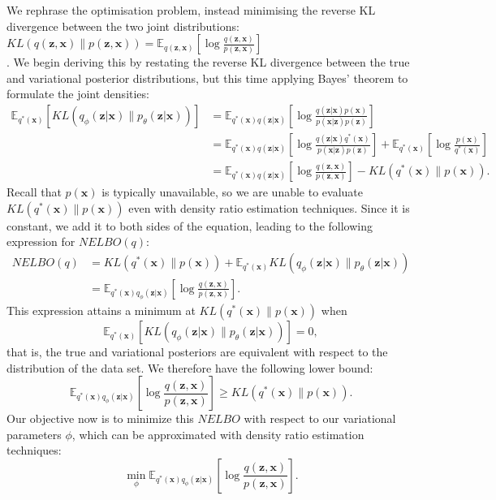 \documentclass[honours,12pt]{unswthesis}
\newcommand{\E}{\mathbb{E}}
\numberwithin{equation}{section}
\theoremstyle{definition}
\begin{document}
We rephrase the optimisation problem, instead minimising the reverse KL divergence between the two joint distributions: $KL(q(\bm{z},\bm{x})\|p(\bm{z},\bm{x}))=\E_{q(\bm{z},\bm{x})}\left[\log\frac{q(\bm{z},\bm{x})}{p(\bm{z},\bm{x})}\right]$\\\citep{tran}. We begin deriving this by restating the reverse KL divergence between the true and variational posterior distributions, but this time applying Bayes' theorem to formulate the joint densities:
\begin{align*}
\mathbb{E}_{q^*(\bm{x})}\left[KL(q_\phi(\bm{z}|\bm{x})\|p_\theta (\bm{z}|\bm{x}))\right]&=\mathbb{E}_{q^*(\bm{x})q(\bm{z}|\bm{x})}\left[\log \frac{q(\bm{z}|\bm{x})p(\bm{x})}{p(\bm{x}|\bm{z})p(\bm{z})}\right]\\
&=\mathbb{E}_{q^*(\bm{x})q(\bm{z}|\bm{x})}\left[\log \frac{q(\bm{z}|\bm{x})q^*(\bm{x})}{p(\bm{x}|\bm{z})p(\bm{z})}\right]+\mathbb{E}_{q^*(\bm{x})}\left[\log \frac{p(\bm{x})}{q^*(\bm{x})}\right]\\
&= \mathbb{E}_{q^*(\bm{x})q(\bm{z}|\bm{x})}\left[\log \frac{q(\bm{z},\bm{x})}{p(\bm{z},\bm{x})}\right]-KL(q^*(\bm{x})\|p(\bm{x})).
\end{align*}
Recall that $p(\bm{x})$ is typically unavailable, so we are unable to evaluate $KL(q^*(\bm{x})\|p(\bm{x}))$ even with density ratio estimation techniques. Since it is constant, we add it to both sides of the equation, leading to the following expression for $NELBO(q)$:
\begin{align*}
NELBO(q) &= KL(q^*(\bm{x})\|p(\bm{x}))+\mathbb{E}_{q^*(\bm{x})}KL(q_\phi(\bm{z}|\bm{x})\|p_\theta(\bm{z}|\bm{x}))\\
&=\mathbb{E}_{q^*(\bm{x})q_\phi(\bm{z}|\bm{x})}\left[\log \frac{q(\bm{z},\bm{x})}{p(\bm{z},\bm{x})}\right].
\end{align*}
This expression attains a minimum at $KL(q^*(\bm{x})\|p(\bm{x}))$ when \[\mathbb{E}_{q^*(\bm{x})}\left[KL(q_\phi(\bm{z}|\bm{x})\|p_\theta(\bm{z}|\bm{x}))\right]=0,\] that is, the true and variational posteriors are equivalent with respect to the distribution of the data set. We therefore have the following lower bound:
\[\mathbb{E}_{q^*(\bm{x})q_\phi(\bm{z}|\bm{x})}\left[\log \frac{q(\bm{z},\bm{x})}{p(\bm{z},\bm{x})}\right]\geq KL(q^*(\bm{x})\|p(\bm{x})).\]
Our objective now is to minimize this $NELBO$ with respect to our variational parameters $\phi$, which can be approximated with density ratio estimation techniques:
\begin{equation}
\min_\phi \mathbb{E}_{q^*(\bm{x})q_\phi(\bm{z}|\bm{x})}\left[\log \frac{q(\bm{z},\bm{x})}{p(\bm{z},\bm{x})}\right].
\end{equation}
\end{document}
